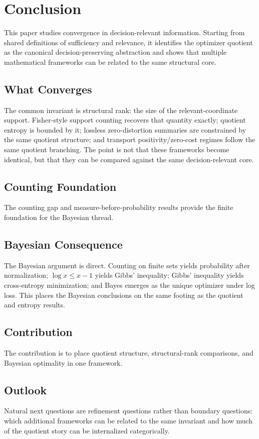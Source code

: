 \section{Conclusion}

This paper studies convergence in decision-relevant information. Starting from shared definitions of sufficiency and relevance, it identifies the optimizer quotient as the canonical decision-preserving abstraction and shows that multiple mathematical frameworks can be related to the same structural core.

\subsection*{What Converges}

The common invariant is structural rank: the size of the relevant-coordinate support. Fisher-style support counting recovers that quantity exactly; quotient entropy is bounded by it; lossless zero-distortion summaries are constrained by the same quotient structure; and transport positivity/zero-cost regimes follow the same quotient branching. The point is not that these frameworks become identical, but that they can be compared against the same decision-relevant core.

\subsection*{Counting Foundation}

The counting gap and measure-before-probability results provide the finite foundation for the Bayesian thread.

\subsection*{Bayesian Consequence}

The Bayesian argument is direct. Counting on finite sets yields probability after normalization; $\log x \le x - 1$ yields Gibbs' inequality; Gibbs' inequality yields cross-entropy minimization; and Bayes emerges as the unique optimizer under log loss. This places the Bayesian conclusions on the same footing as the quotient and entropy results.

\subsection*{Contribution}

The contribution is to place quotient structure, structural-rank comparisons, and Bayesian optimality in one framework.

\subsection*{Outlook}

Natural next questions are refinement questions rather than boundary questions: which additional frameworks can be related to the same invariant and how much of the quotient story can be internalized categorically.
